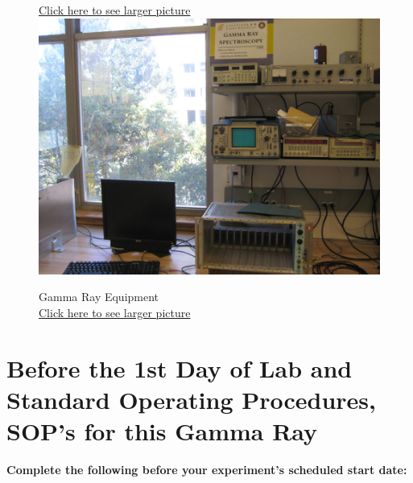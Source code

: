 \documentclass{../lab}
\begin{document}
\begin{figure}[H]
{  \href{http://experimentationlab.berkeley.edu/sites/default/files/images/GMA_PMT_3519-Lg.jpg}{Click here to see larger picture}}
  \label{fig:PMT}
\endminipage\hfill
{}
  \href{http://experimentationlab.berkeley.edu/sites/default/files/images/GMA_Equip_3518-Lg.jpg}{\includegraphics[width=\linewidth,keepaspectratio]{images/GMA_Equip_3518-Lg.jpg}}
  \caption{Gamma Ray Equipment \\ \href{http://experimentationlab.berkeley.edu/sites/default/files/images/GMA_Equip_3518-Lg.jpg}{Click here to see larger picture}}\label{fig:Equipment}
\endminipage
\end{figure}

\section{Before the 1st Day of Lab and Standard Operating Procedures, SOP's for this Gamma Ray}

\noindent\textbf{Complete the following before your experiment's scheduled start date:}
\end{document}
